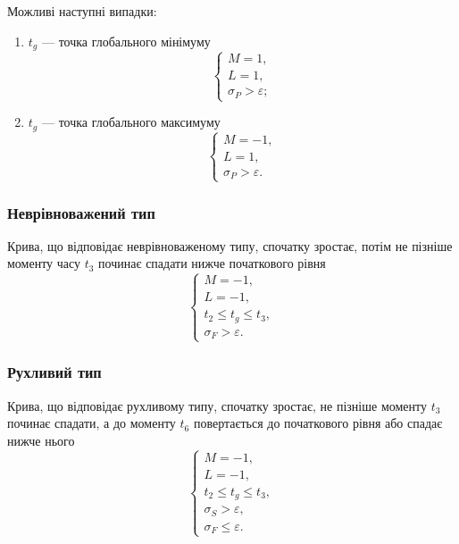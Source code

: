 Можливі наступні випадки:
\begin{enumerate}
  \item
    $t_g$ --- точка глобального мінімуму
    \begin{equation*}
      \begin{cases}
        M = 1, \\
        L = 1, \\
        \sigma_P > \varepsilon;
      \end{cases}
    \end{equation*}
  \item
    $t_g$ --- точка глобального максимуму
    \begin{equation*}
      \begin{cases}
        M = -1, \\
        L = 1, \\
        \sigma_P > \varepsilon.
      \end{cases}
    \end{equation*}
\end{enumerate}

\subsubsection{Неврівноважений тип}
Крива, що відповідає неврівноваженому типу, спочатку зростає,
потім не пізніше моменту часу $t_3$ починає спадати нижче початкового рівня
\begin{equation*}
  \begin{cases}
    M = -1, \\
    L = -1, \\
    t_2 \le t_g \le t_3, \\
    \sigma_F > \varepsilon.
  \end{cases}
\end{equation*}

\subsubsection{Рухливий тип}
Крива, що відповідає рухливому типу, спочатку зростає,
не пізніше моменту $t_3$ починає спадати,
а до моменту $t_6$ повертається до початкового рівня або спадає нижче нього
\begin{equation*}
  \begin{cases}
    M = -1, \\
    L = -1, \\
    t_2 \le t_g \le t_3, \\
    \sigma_S > \varepsilon, \\
    \sigma_F \le \varepsilon.
  \end{cases}
\end{equation*}

